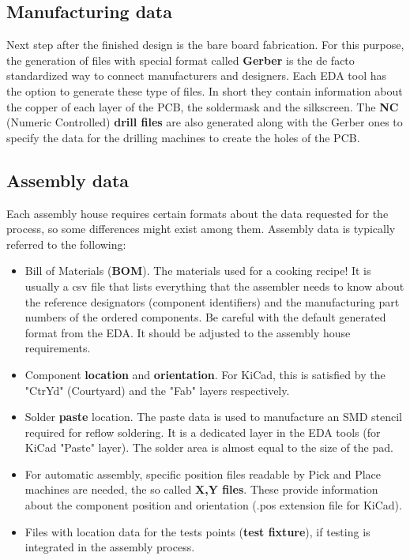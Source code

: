 \documentclass[final]{cubedoc}
\begin{document}
	\subsection{Manufacturing data}
	
	Next step after the finished design is the bare board fabrication. For this purpose, the generation of files with special format called \textbf{Gerber} is the de facto standardized way to connect manufacturers and designers. Each EDA tool has the option to generate these type of files. In short they contain information about the copper of each layer of the PCB, the soldermask and the silkscreen. The \textbf{NC} (Numeric Controlled) \textbf{drill files} are also generated along with the Gerber ones to specify the data for the drilling machines to create the holes of the PCB.
	
	
	\subsection{Assembly data}
	
	Each assembly house requires certain formats about the data requested for the process, so some differences might exist among them. Assembly data is typically referred to the following:
	
	\begin{itemize}	
		\item Bill of Materials (\textbf{BOM}). The materials used for a cooking recipe! It is usually a csv file that lists everything that the assembler needs to know about the reference designators (component identifiers) and the manufacturing part numbers of the ordered components. Be careful with the default generated format from the EDA. It should be adjusted to the assembly house requirements.
		\item Component \textbf{location} and \textbf{orientation}. For KiCad, this is satisfied by the "CtrYd" (Courtyard) and the "Fab" layers respectively.
		\item Solder \textbf{paste} location. The paste data is used to manufacture an SMD stencil required for reflow soldering. It is a dedicated layer in the EDA tools (for KiCad "Paste" layer). The solder area is almost equal to the size of the pad.
		\item For automatic assembly, specific position files readable by Pick and Place machines are needed, the so called \textbf{X,Y files}. These provide information about the component position and orientation (.pos extension file for KiCad).
		\item Files with location data for the tests points (\textbf{test fixture}), if testing is integrated in the assembly process.
	\end{itemize}
	
\end{document}
